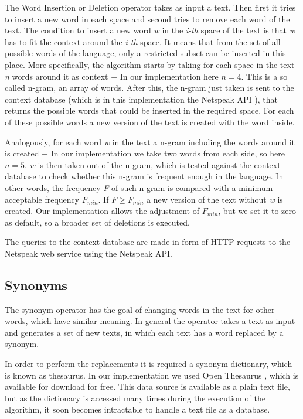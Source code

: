 \documentclass[11pt]{reportAlternative}
\begin{document}
The Word Insertion or Deletion operator takes as input a text. Then first it tries to insert a new word in each space and second tries to remove each word of the text. The condition to insert a new word \emph{w} in the \emph{i-th} space of the text is that \emph{w} has to fit the context around the \emph{i-th} space. It means that from the set of all possible words of the language, only a restricted subset can be inserted in this place. More specifically, the algorithm starts by taking for each space in the text \emph{n} words around it as context $-$ In our implementation here $n = 4$. This is a so called n-gram, an array of words. After this, the n-gram just taken is sent to the context database (which is in this implementation the Netspeak API \cite{Netspeak}), that returns the possible words that could be inserted in the required space. For each of these possible words a new version of the text is created with the word inside. \par

Analogously, for each word \emph{w} in the text a n-gram including the words around it is created $-$ In our implementation we take two words from each side, so here $n=5$. \emph{w} is then taken out of the n-gram, which is tested against the context database to check whether this n-gram is frequent enough in the language. In other words, the frequency \emph{F} of such n-gram is compared with a minimum acceptable frequency $F_{min}$. If $F \ge F_{min}$ a new version of the text without \emph{w} is created. Our implementation allows the adjustment of $F_{min}$, but we set it to zero as default, so a broader set of deletions is executed. \par

The queries to the context database are made in form of HTTP requests to the Netspeak web service using the Netspeak API. \par

\subsection{Synonyms}
The synonym operator has the goal of changing words in the text for other words, which have similar meaning. In general the operator takes a text as input and generates a set of new texts, in which each text has a word replaced by a synonym.

In order to perform the replacements it is required a synonym dictionary, which is known as thesaurus. In our implementation we used Open Thesaurus \cite{OpenThesuarus}, which is available for download for free. This data source is available as a plain text file, but as the dictionary is accessed many times during the execution of the algorithm, it soon becomes intractable to handle a text file as a database.
\end{document}
